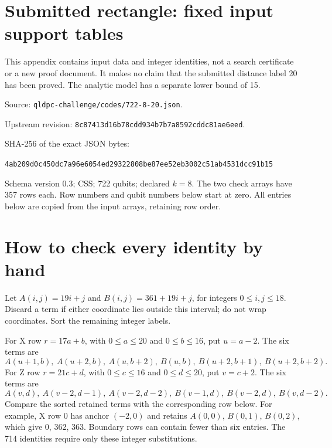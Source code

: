 \documentclass{article}
\begin{document}
\section{Submitted rectangle: fixed input support tables}\label{sec:input}

This appendix contains input data and integer identities, not a search certificate
or a new proof document. It makes no claim that the submitted distance label 20
has been proved. The analytic model has a separate lower bound of 15.

Source: \nolinkurl{qldpc-challenge/codes/722-8-20.json}.

Upstream revision: \texttt{8c87413d16b78cdd934b7b7a8592cddc81ae6eed}.

SHA-256 of the exact JSON bytes:
\begin{center}
  \texttt{4ab209d0c450dc7a96e6054ed29322808be87ee52eb3002c51ab4531dcc91b15}
\end{center}

Schema version 0.3; CSS; 722 qubits; declared \(k = 8\). The two check arrays
have 357 rows each. Row numbers and qubit numbers below start at zero.
All entries below are copied from the input arrays, retaining row order.

\section{How to check every identity by hand}\label{sec:by-hand}

Let \(A(i,j) = 19i + j\) and \(B(i,j) = 361 + 19i + j\), for integers
\(0 \le i,j \le 18\). Discard a term if either coordinate lies outside this interval;
do not wrap coordinates. Sort the remaining integer labels.

For X row \(r = 17a + b\), with \(0 \le a \le 20\) and \(0 \le b \le 16\), put \(u = a - 2\).
The six terms are
\begin{equation}
  A(u+1,b),\ A(u+2,b),\ A(u,b+2),\ B(u,b),\ B(u+2,b+1),\ B(u+2,b+2).
\end{equation}
For Z row \(r = 21c + d\), with \(0 \le c \le 16\) and \(0 \le d \le 20\), put \(v = c + 2\).
The six terms are
\begin{equation}
  A(v,d),\ A(v-2,d-1),\ A(v-2,d-2),\ B(v-1,d),\ B(v-2,d),\ B(v,d-2).
\end{equation}
Compare the sorted retained terms with the corresponding row below. For example,
X row 0 has anchor \((-2,0)\) and retains \(A(0,0)\), \(B(0,1)\), \(B(0,2)\),
which give 0, 362, 363. Boundary rows can contain fewer than six entries.
The 714 identities require only these integer substitutions.
\end{document}
